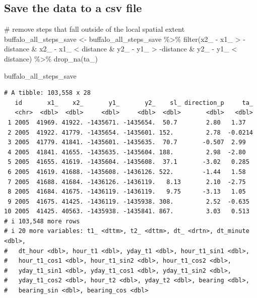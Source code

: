 \documentclass[
  letterpaper,
  DIV=11,
  numbers=noendperiod]{scrartcl}
\newenvironment{Shaded}{\begin{snugshade}}{\end{snugshade}}
\newcommand{\CommentTok}[1]{\textcolor[rgb]{0.37,0.37,0.37}{#1}}
\newcommand{\FunctionTok}[1]{\textcolor[rgb]{0.28,0.35,0.67}{#1}}
\newcommand{\NormalTok}[1]{\textcolor[rgb]{0.00,0.23,0.31}{#1}}
\newcommand{\OtherTok}[1]{\textcolor[rgb]{0.00,0.23,0.31}{#1}}
\newcommand{\SpecialCharTok}[1]{\textcolor[rgb]{0.37,0.37,0.37}{#1}}
\begin{document}
\subsection{Save the data to a csv
file}\label{save-the-data-to-a-csv-file}

\begin{Shaded}
\begin{Highlighting}[]
\CommentTok{\# remove steps that fall outside of the local spatial extent}
\NormalTok{buffalo\_all\_steps\_save }\OtherTok{\textless{}{-}}\NormalTok{ buffalo\_all\_steps\_save }\SpecialCharTok{\%\textgreater{}\%}
  \FunctionTok{filter}\NormalTok{(x2\_ }\SpecialCharTok{{-}}\NormalTok{ x1\_ }\SpecialCharTok{\textgreater{}} \SpecialCharTok{{-}}\NormalTok{distance }\SpecialCharTok{\&} 
\NormalTok{           x2\_ }\SpecialCharTok{{-}}\NormalTok{ x1\_ }\SpecialCharTok{\textless{}}\NormalTok{ distance }\SpecialCharTok{\&}
\NormalTok{           y2\_ }\SpecialCharTok{{-}}\NormalTok{ y1\_ }\SpecialCharTok{\textgreater{}} \SpecialCharTok{{-}}\NormalTok{distance }\SpecialCharTok{\&} 
\NormalTok{           y2\_ }\SpecialCharTok{{-}}\NormalTok{ y1\_ }\SpecialCharTok{\textless{}}\NormalTok{ distance) }\SpecialCharTok{\%\textgreater{}\%} 
  \FunctionTok{drop\_na}\NormalTok{(ta\_)}

\NormalTok{buffalo\_all\_steps\_save}
\end{Highlighting}
\end{Shaded}

\begin{verbatim}
# A tibble: 103,558 x 28
   id       x1_    x2_       y1_       y2_    sl_ direction_p     ta_
   <chr>  <dbl>  <dbl>     <dbl>     <dbl>  <dbl>       <dbl>   <dbl>
 1 2005  41969. 41922. -1435671. -1435654.  50.7        2.80   1.37  
 2 2005  41922. 41779. -1435654. -1435601. 152.         2.78  -0.0214
 3 2005  41779. 41841. -1435601. -1435635.  70.7       -0.507  2.99  
 4 2005  41841. 41655. -1435635. -1435604. 188.         2.98  -2.80  
 5 2005  41655. 41619. -1435604. -1435608.  37.1       -3.02   0.285 
 6 2005  41619. 41688. -1435608. -1436126. 522.        -1.44   1.58  
 7 2005  41688. 41684. -1436126. -1436119.   8.13       2.10  -2.75  
 8 2005  41684. 41675. -1436119. -1436119.   9.75      -3.13   1.05  
 9 2005  41675. 41425. -1436119. -1435938. 308.         2.52  -0.635 
10 2005  41425. 40563. -1435938. -1435841. 867.         3.03   0.513 
# i 103,548 more rows
# i 20 more variables: t1_ <dttm>, t2_ <dttm>, dt_ <drtn>, dt_minute <dbl>,
#   dt_hour <dbl>, hour_t1 <dbl>, yday_t1 <dbl>, hour_t1_sin1 <dbl>,
#   hour_t1_cos1 <dbl>, hour_t1_sin2 <dbl>, hour_t1_cos2 <dbl>,
#   yday_t1_sin1 <dbl>, yday_t1_cos1 <dbl>, yday_t1_sin2 <dbl>,
#   yday_t1_cos2 <dbl>, hour_t2 <dbl>, yday_t2 <dbl>, bearing <dbl>,
#   bearing_sin <dbl>, bearing_cos <dbl>
\end{verbatim}
\end{document}
